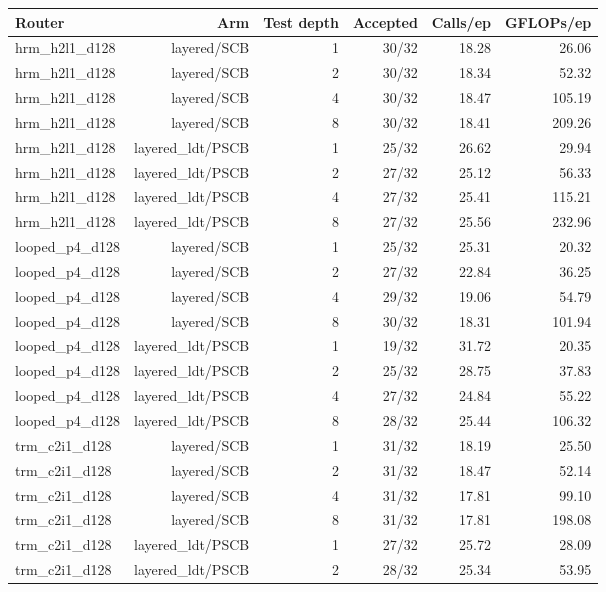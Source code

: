 \begin{table}[t]
\centering
\small
\begin{adjustbox}{max width=\linewidth}
\begin{tabular}{lrrrrr}
\toprule
Router & Arm & Test depth & Accepted & Calls/ep & GFLOPs/ep \\
\midrule
hrm\_h2l1\_d128 & layered/SCB & 1 & 30/32 & 18.28 & 26.06 \\
hrm\_h2l1\_d128 & layered/SCB & 2 & 30/32 & 18.34 & 52.32 \\
hrm\_h2l1\_d128 & layered/SCB & 4 & 30/32 & 18.47 & 105.19 \\
hrm\_h2l1\_d128 & layered/SCB & 8 & 30/32 & 18.41 & 209.26 \\
hrm\_h2l1\_d128 & layered\_ldt/PSCB & 1 & 25/32 & 26.62 & 29.94 \\
hrm\_h2l1\_d128 & layered\_ldt/PSCB & 2 & 27/32 & 25.12 & 56.33 \\
hrm\_h2l1\_d128 & layered\_ldt/PSCB & 4 & 27/32 & 25.41 & 115.21 \\
hrm\_h2l1\_d128 & layered\_ldt/PSCB & 8 & 27/32 & 25.56 & 232.96 \\
looped\_p4\_d128 & layered/SCB & 1 & 25/32 & 25.31 & 20.32 \\
looped\_p4\_d128 & layered/SCB & 2 & 27/32 & 22.84 & 36.25 \\
looped\_p4\_d128 & layered/SCB & 4 & 29/32 & 19.06 & 54.79 \\
looped\_p4\_d128 & layered/SCB & 8 & 30/32 & 18.31 & 101.94 \\
looped\_p4\_d128 & layered\_ldt/PSCB & 1 & 19/32 & 31.72 & 20.35 \\
looped\_p4\_d128 & layered\_ldt/PSCB & 2 & 25/32 & 28.75 & 37.83 \\
looped\_p4\_d128 & layered\_ldt/PSCB & 4 & 27/32 & 24.84 & 55.22 \\
looped\_p4\_d128 & layered\_ldt/PSCB & 8 & 28/32 & 25.44 & 106.32 \\
trm\_c2i1\_d128 & layered/SCB & 1 & 31/32 & 18.19 & 25.50 \\
trm\_c2i1\_d128 & layered/SCB & 2 & 31/32 & 18.47 & 52.14 \\
trm\_c2i1\_d128 & layered/SCB & 4 & 31/32 & 17.81 & 99.10 \\
trm\_c2i1\_d128 & layered/SCB & 8 & 31/32 & 17.81 & 198.08 \\
trm\_c2i1\_d128 & layered\_ldt/PSCB & 1 & 27/32 & 25.72 & 28.09 \\
trm\_c2i1\_d128 & layered\_ldt/PSCB & 2 & 28/32 & 25.34 & 53.95 \\

\end{tabular}
\end{adjustbox}
\end{table}
